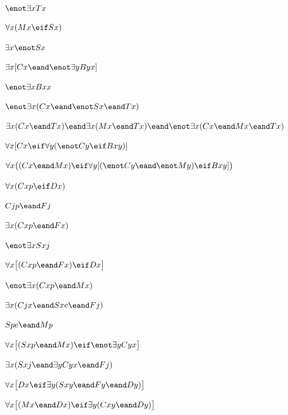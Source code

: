 \begin{earg}
\item %
$\enot\exists x Tx$
\item %
$\forall x(Mx \eif Sx)$
\item %
$\exists x \enot Sx$
\item %
$\exists x[Cx \eand \enot\exists y Byx]$
\item %
$\enot \exists x Bxx$
\item %
$\enot \exists x(Cx \eand \enot Sx \eand Tx)$
\item %
$\exists x(Cx \eand Tx) \eand \exists x(Mx \eand Tx) \eand \enot \exists x(Cx \eand Mx \eand Tx)$
\item %
$\forall x[Cx \eif \forall y(\enot Cy \eif Bxy)]$
\item %
$\forall x\bigl((Cx \eand Mx) \eif \forall y[(\enot Cy \eand \enot My) \eif Bxy]\bigr)$
\end{earg}


\begin{earg}
\item %
$\forall x(Cxp \eif Dx)$
\item %
$Cjp \eand Fj$
\item %
$\exists x(Cxp \eand Fx)$
\item %
$\enot\exists x Sxj$
\item %
$\forall x\bigl[(Cxp \eand Fx)\eif Dx\bigr]$
\item %
$\enot\exists x(Cxp \eand Mx)$
\item %
$\exists x(Cjx \eand Sxe \eand Fj)$
\item %
$Spe \eand Mp$
\item %
$\forall x\bigl[(Sxp \eand Mx) \eif \enot\exists y Cyx\bigr]$
\item %
$\exists x(Sxj \eand \exists y Cyx \eand Fj)$
\item %
$\forall x\bigl[Dx \eif \exists y(Sxy \eand Fy \eand Dy)\bigr]$
\item %
$\forall x\bigl[(Mx \eand Dx) \eif \exists y(Cxy \eand Dy)\bigr]$
\end{earg}

